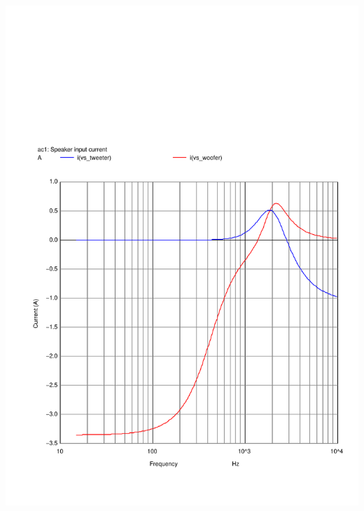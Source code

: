 \documentclass[10pt]{article}
\begin{document}
\begin{multicols}{2}
	\includegraphics[scale=0.35,page=1]{../crossover/ngspice/in_current.pdf}
\end{multicols}
\end{document}
